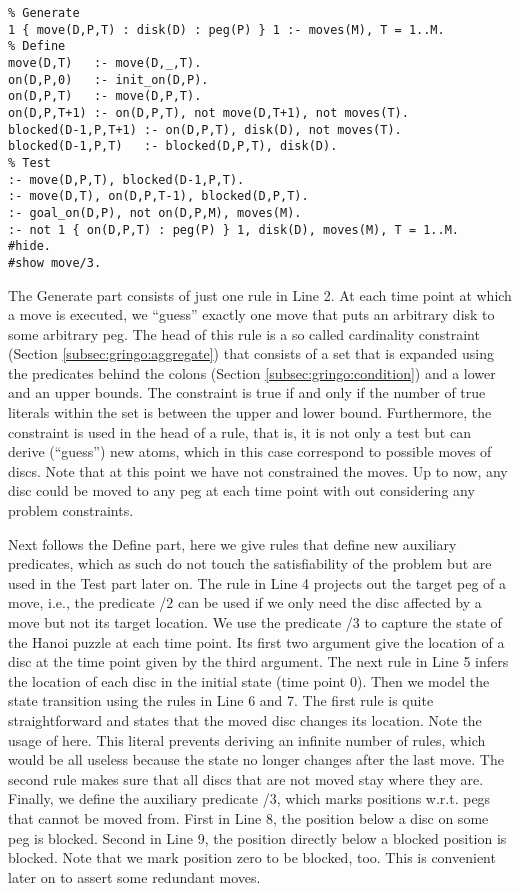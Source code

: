 \begin{lstlisting}
% Generate
1 { move(D,P,T) : disk(D) : peg(P) } 1 :- moves(M), T = 1..M.
% Define
move(D,T)   :- move(D,_,T).
on(D,P,0)   :- init_on(D,P).
on(D,P,T)   :- move(D,P,T).
on(D,P,T+1) :- on(D,P,T), not move(D,T+1), not moves(T).
blocked(D-1,P,T+1) :- on(D,P,T), disk(D), not moves(T).
blocked(D-1,P,T)   :- blocked(D,P,T), disk(D).
% Test
:- move(D,P,T), blocked(D-1,P,T).
:- move(D,T), on(D,P,T-1), blocked(D,P,T).
:- goal_on(D,P), not on(D,P,M), moves(M). 
:- not 1 { on(D,P,T) : peg(P) } 1, disk(D), moves(M), T = 1..M.
#hide.
#show move/3. 
\end{lstlisting}%
The Generate part consists of just one rule in Line 2.
At each time point  at which a move is executed, we
``guess'' exactly one move that puts an arbitrary disk to some arbitrary peg.
The head of this rule is a so called cardinality constraint (Section \ref{subsec:gringo:aggregate}) that
consists of a set that is expanded using the predicates behind the colons (Section \ref{subsec:gringo:condition}) and a lower and an upper bounds.
The constraint is true if and only if the number of true literals within the set is between the upper and lower bound.
Furthermore, the constraint is used in the head of a rule, 
that is, it is not only a test but can derive (``guess'') new atoms, which in this case correspond to possible moves of discs.
Note that at this point we have not constrained the moves.
Up to now, any disc could be moved to any peg at each time point with out considering any problem constraints.

Next follows the Define part, here we give rules that define new auxiliary predicates, 
which as such do not touch the satisfiability of the problem but are used in the Test part later on.
The rule in Line 4 projects out the target peg of a move, i.e., the predicate /$2$ can be used 
if we only need the disc affected by a move but not its target location.
We use the predicate /$3$ to capture the state of the Hanoi puzzle at each time point.
Its first two argument give the location of a disc at the time point given by the third argument.
The next rule in Line 5 infers the location of each disc in the initial state (time point 0).
Then we model the state transition using the rules in Line 6 and 7.
The first rule is quite straightforward and states that the moved disc changes its location.
Note the usage of  here.
This literal prevents deriving an infinite number of rules, which would be all useless 
because the state no longer changes after the last move.
The second rule makes sure that all discs that are not moved stay where they are.
Finally, we define the auxiliary predicate /$3$, 
which marks positions w.r.t. pegs that cannot be moved from.
First in Line 8, the position below a disc on some peg is blocked.
Second in Line 9, the position directly below a blocked position is blocked.
Note that we mark position zero to be blocked, too.
This is convenient later on to assert some redundant moves.

